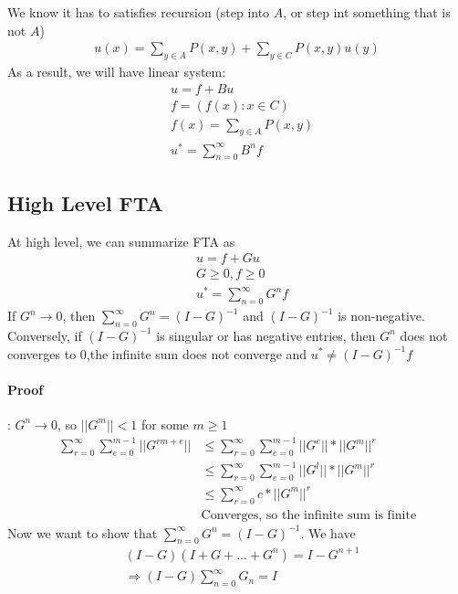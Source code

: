 We know it has to satisfies recursion (step into $A$, or step int something that is not $A$)
    \begin{align*}
        u(x) = \sum_{y\in A} P(x,y) + \sum_{y\in C} P(x,y) u(y)
    \end{align*}
As a result, we will have linear system: 
    \begin{align*}
        & u = f + B u \\
        & f = (f(x) : x\in C)\\
        & f(x) = \sum_{y\in A} P(x,y) \\
        & u^* = \sum_{n=0}^\infty B^n f
    \end{align*}
    

\subsection{High Level FTA} 
At high level, we can summarize FTA as 
    \begin{align*}
        & u = f + G u \\
        & G \geq 0, f \geq 0 \\
        & u^* = \sum_{n=0}^\infty G^n f
    \end{align*}
If $G^n \to 0$, then $\sum_{n=0}^\infty G^n = (I-G)^{-1}$ and $(I-G)^{-1}$ is non-negative. Conversely, if $(I-G)^{-1}$ is singular or has negative entries, then $G^n$ does not converges to 0,the infinite sum does not converge and $u^* \neq (I-G)^{-1} f$

\paragraph{Proof}: $G^n \to 0$, so $||G^m||< 1$ for some $m \geq 1$
\begin{align*}
    \sum_{r=0}^\infty \sum_{e=0}^{m-1} ||G^{rm + e}|| 
    & \leq \sum_{r=0}^\infty \sum_{e=0}^{m-1} || G^e|| * || G^m||^r \\
    & \leq \sum_{r=0}^\infty \sum_{e=0}^{m-1} || G^l|| * || G^m||^r\\
    & \leq \sum_{r=0}^\infty c * || G^m||^r \\
    & \text{Converges, so the infinite sum is finite}
\end{align*}
Now we want to show that $\sum_{n=0}^\infty G^n = (I-G)^{-1}$. We have 
    \begin{align*}
        & (I - G) (I + G + ... + G^n) = I-G^{n+1}\\
        & \Rightarrow (I-G)\sum_{n=0}^\infty G_n = I
    \end{align*}
    
